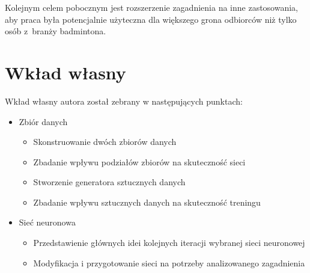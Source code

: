 Kolejnym celem pobocznym jest rozszerzenie zagadnienia na inne zastosowania, aby praca była potencjalnie użyteczna dla większego grona odbiorców niż tylko osób z~branży badmintona.
\\

\section{Wkład własny}

Wkład własny autora został zebrany w następujących punktach:

\begin{itemize}
	\item Zbiór danych
    \begin{itemize}
      \item Skonstruowanie dwóch zbiorów danych 
      \item Zbadanie wpływu podziałów zbiorów na skuteczność sieci 
			\item Stworzenie generatora sztucznych danych 
			\item Zbadanie wpływu sztucznych danych na skuteczność treningu 
		\end{itemize}
	\item Sieć neuronowa
	\begin{itemize}
		\item Przedstawienie głównych idei kolejnych iteracji wybranej sieci neuronowej 
		\item Modyfikacja i przygotowanie sieci na potrzeby analizowanego zagadnienia 
	\end{itemize}
\end{itemize}
